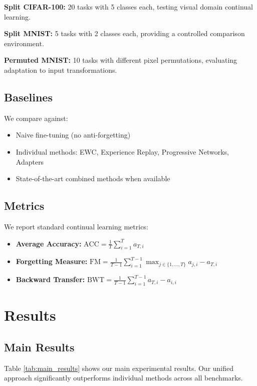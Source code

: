 \documentclass{article}
\begin{document}
\textbf{Split CIFAR-100:} 20 tasks with 5 classes each, testing visual domain continual learning.

\textbf{Split MNIST:} 5 tasks with 2 classes each, providing a controlled comparison environment.

\textbf{Permuted MNIST:} 10 tasks with different pixel permutations, evaluating adaptation to input transformations.

\subsection{Baselines}

We compare against:
\begin{itemize}
    \item Naive fine-tuning (no anti-forgetting)
    \item Individual methods: EWC, Experience Replay, Progressive Networks, Adapters
    \item State-of-the-art combined methods when available
\end{itemize}

\subsection{Metrics}

We report standard continual learning metrics:
\begin{itemize}
    \item \textbf{Average Accuracy:} $\text{ACC} = \frac{1}{T} \sum_{i=1}^T a_{T,i}$
    \item \textbf{Forgetting Measure:} $\text{FM} = \frac{1}{T-1} \sum_{i=1}^{T-1} \max_{j \in \{1,...,T\}} a_{j,i} - a_{T,i}$
    \item \textbf{Backward Transfer:} $\text{BWT} = \frac{1}{T-1} \sum_{i=1}^{T-1} a_{T,i} - a_{i,i}$
\end{itemize}

\section{Results}

\subsection{Main Results}

Table \ref{tab:main_results} shows our main experimental results. Our unified approach significantly outperforms individual methods across all benchmarks.
\end{document}
